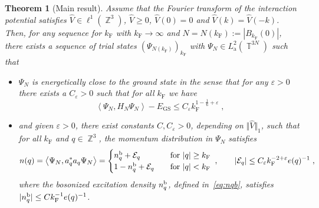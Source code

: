\documentclass[12pt,a4paper]{article}
\numberwithin{equation}{section}
\newcommand{\cE}{\mathcal{E}}
\newcommand{\1}{\mathbb{I}}
\renewcommand{\b}{\textnormal{b}}
\newcommand{\F}{\mathrm{F}}
\newcommand{\GS}{\mathrm{GS}}
\DeclareMathOperator{\Z}{\mathbb{Z}}
\DeclareMathOperator{\T}{\mathbb{T}}
\newcommand{\eva}[1]{\left\langle #1 \right\rangle}
\theoremstyle{plain}
\newtheorem{theorem}{Theorem}[section]
\theoremstyle{definition}
\theoremstyle{remark}
\theoremstyle{plain}
\theoremstyle{definition}
\theoremstyle{remark}
\begin{document}
\begin{theorem}[Main result] \label{thm:main}
Assume that the Fourier transform of the interaction potential satisfies $ \hat{V} \in \ell^1(\Z^3) $, $ \hat{V} \ge 0 $, $ \hat{V}(0) = 0 $ and $ \hat{V}(k) = \hat{V}(-k) $.
Then, for any sequence for $ k_{\F} $ with $ k_{\F} \to \infty $ and $ N = N(k_{\F}) := |B_{k_{\F}}(0)| $, there exists a sequence of trial states $ (\Psi_{N(k_{\F})})_{k_{\F}} $ with $ \Psi_N \in L^2_{\mathrm{a}}(\T^{3N}) $ such that
\begin{itemize}
\item $ \Psi_N $ is energetically close to the ground state in the sense that for any $ \varepsilon > 0 $ there exists a $ C_\varepsilon > 0 $ such that for all $ k_{\F} $ we have
\begin{equation} \label{eq:main1}
	\eva{\Psi_N, H_N \Psi_N} - E_{\GS}
	\le C_\varepsilon k_{\F}^{1-\frac 16 + \varepsilon} \;,
\end{equation}
\item and given $ \varepsilon > 0 $, there exist constants $ C, C_\varepsilon > 0 $, depending on $ \Vert \hat{V} \Vert_1 $, such that for all $ k_{\F} $ and $ q \in \Z^3 $, the momentum distribution in $ \Psi_N $ satisfies
\begin{equation} \label{eq:main2}
	n(q) = \eva{\Psi_N, a_q^* a_q \Psi_N}
	= \begin{cases}
	n_q^{\b} + \cE_q& \quad
		\textnormal{for } |q| \ge k_{\F} \\
	1 - n_q^{\b} + \cE_q& \quad
		\textnormal{for } |q| < k_{\F} 
	\end{cases} \;, \qquad
	|\cE_q| \le C_\varepsilon k_{\F}^{-2 +\varepsilon} e(q)^{-1} \;,
\end{equation}
where the bosonized excitation density $ n_q^{\b} $, defined in~\eqref{eq:nqb}, satisfies $ |n_q^{\b}| \le C k_{\F}^{-1} e(q)^{-1} $.
\end{itemize} 
\end{theorem}
\end{document}
